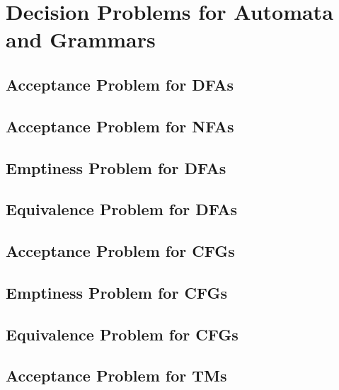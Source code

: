 \chapter{Decision Problems for Automata and Grammars}

\section{Acceptance Problem for DFAs}
\section{Acceptance Problem for NFAs}
\section{Emptiness Problem for DFAs}
\section{Equivalence Problem for DFAs}
\section{Acceptance Problem for CFGs}
\section{Emptiness Problem for CFGs}
\section{Equivalence Problem for CFGs}
\section{Acceptance Problem for TMs}